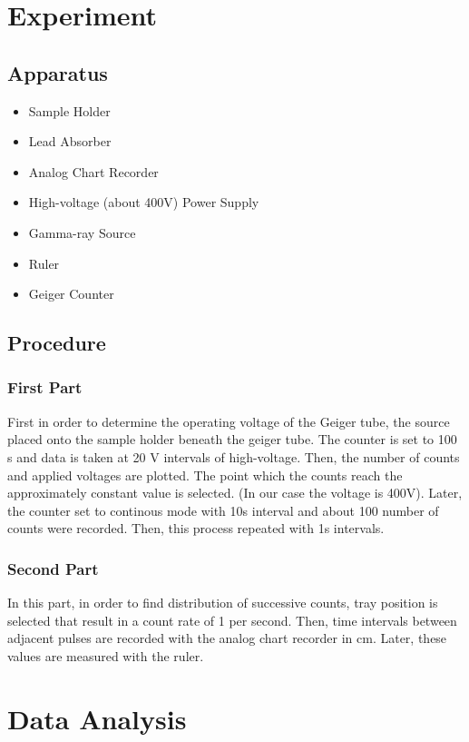 \documentclass[reprint,amsmath,aps,nofootinbib,english]{revtex4-2}
\begin{document}
\section{Experiment}
\subsection{Apparatus}
\begin{itemize}
        \item Sample Holder
        \item Lead Absorber 
        \item Analog Chart Recorder
        \item High-voltage (about 400V) Power Supply 
        \item Gamma-ray Source
        \item Ruler
        \item Geiger Counter
\end{itemize}
\subsection{Procedure}
\subsubsection{First Part}
First in order to determine the operating voltage of the Geiger tube, the source placed onto the sample holder beneath the geiger tube. The counter is set to 100 s and data is taken at 20 V intervals of high-voltage. Then, the number of counts and applied voltages are plotted. The point which the counts reach the approximately constant value is selected. (In our case the voltage is 400V). Later, the counter set to continous mode with 10s interval and about 100 number of counts were recorded. Then, this process repeated with 1s intervals.  
\subsubsection{Second Part}
In this part, in order to find distribution of successive counts, tray position is selected that result in a count rate of 1 per second. Then, time intervals between adjacent pulses are recorded with the analog chart recorder in cm. Later, these values are measured with the ruler.  
\section{Data Analysis}
\end{document}
